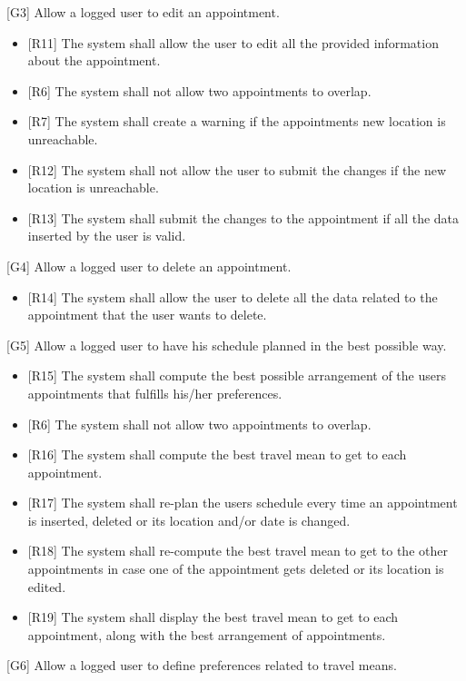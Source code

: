\documentclass[12pt]{article}
\begin{document}
{[G3]} Allow a logged user to edit an appointment.
\begin{itemize}
    \item{[R11]} The system shall allow the user to edit all the provided information about the appointment.
    \item{[R6]} The system shall not allow two appointments to overlap.
    \item{[R7]} The system shall create a warning if the appointments new location is unreachable.
    \item{[R12]} The system shall not allow the user to submit the changes if the new location is unreachable.
    \item{[R13]} The system shall submit the changes to the appointment if all the data inserted by the user is valid.
\end{itemize}
{[G4]} Allow a logged user to delete an appointment.
\begin{itemize}
    \item{[R14]} The system shall allow the user to delete all the data related to the appointment that the user wants to delete.
\end{itemize}
{[G5]} Allow a logged user to have his schedule planned in the best possible way.
\begin{itemize}
    \item{[R15]} The system shall compute the best possible arrangement of the users appointments that fulfills his/her preferences.
    \item{[R6]} The system shall not allow two appointments to overlap.
    \item{[R16]} The system shall compute the best travel mean to get to each appointment.
    \item{[R17]} The system shall re-plan the users schedule every time an appointment is inserted, deleted or its location and/or date is changed.
    \item{[R18]} The system shall re-compute the best travel mean to get to the other appointments in case one of the appointment gets deleted or its location is edited.
    \item{[R19]} The system shall display the best travel mean to get to each appointment, along with the best arrangement of appointments.
    
\end{itemize}
{[G6]} Allow a logged user to define preferences related to travel means.
\end{document}

